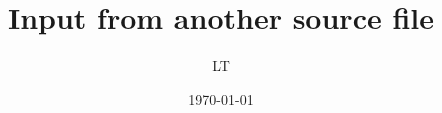 \documentclass{article}
\begin{document}
\title{Input from another source file}
\author{LT}
\date{\today}
\maketitle


\end{document}

